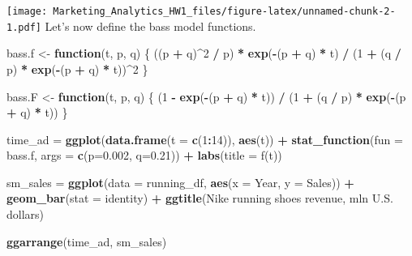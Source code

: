 \documentclass[
]{article}
\newenvironment{Shaded}{\begin{snugshade}}{\end{snugshade}}
\newcommand{\AttributeTok}[1]{\textcolor[rgb]{0.13,0.29,0.53}{#1}}
\newcommand{\ControlFlowTok}[1]{\textcolor[rgb]{0.13,0.29,0.53}{\textbf{#1}}}
\newcommand{\DecValTok}[1]{\textcolor[rgb]{0.00,0.00,0.81}{#1}}
\newcommand{\FloatTok}[1]{\textcolor[rgb]{0.00,0.00,0.81}{#1}}
\newcommand{\FunctionTok}[1]{\textcolor[rgb]{0.13,0.29,0.53}{\textbf{#1}}}
\newcommand{\NormalTok}[1]{#1}
\newcommand{\OtherTok}[1]{\textcolor[rgb]{0.56,0.35,0.01}{#1}}
\newcommand{\SpecialCharTok}[1]{\textcolor[rgb]{0.81,0.36,0.00}{\textbf{#1}}}
\newcommand{\StringTok}[1]{\textcolor[rgb]{0.31,0.60,0.02}{#1}}
\begin{document}
\texttt{[image: Marketing\_Analytics\_HW1\_files/figure-latex/unnamed-chunk-2-1.pdf]}
Let's now define the bass model functions.

\begin{Shaded}
\begin{Highlighting}[]
\NormalTok{bass.f }\OtherTok{\textless{}{-}} \ControlFlowTok{function}\NormalTok{(t, p, q) \{}
\NormalTok{  ((p }\SpecialCharTok{+}\NormalTok{ q)}\SpecialCharTok{\^{}}\DecValTok{2} \SpecialCharTok{/}\NormalTok{ p) }\SpecialCharTok{*} \FunctionTok{exp}\NormalTok{(}\SpecialCharTok{{-}}\NormalTok{(p }\SpecialCharTok{+}\NormalTok{ q) }\SpecialCharTok{*}\NormalTok{ t) }\SpecialCharTok{/}\NormalTok{ (}\DecValTok{1} \SpecialCharTok{+}\NormalTok{ (q }\SpecialCharTok{/}\NormalTok{ p) }\SpecialCharTok{*} \FunctionTok{exp}\NormalTok{(}\SpecialCharTok{{-}}\NormalTok{(p }\SpecialCharTok{+}\NormalTok{ q) }\SpecialCharTok{*}\NormalTok{ t))}\SpecialCharTok{\^{}}\DecValTok{2}
\NormalTok{\}}

\NormalTok{bass.F }\OtherTok{\textless{}{-}} \ControlFlowTok{function}\NormalTok{(t, p, q) \{}
\NormalTok{  (}\DecValTok{1} \SpecialCharTok{{-}} \FunctionTok{exp}\NormalTok{(}\SpecialCharTok{{-}}\NormalTok{(p }\SpecialCharTok{+}\NormalTok{ q) }\SpecialCharTok{*}\NormalTok{ t)) }\SpecialCharTok{/}\NormalTok{ (}\DecValTok{1} \SpecialCharTok{+}\NormalTok{ (q }\SpecialCharTok{/}\NormalTok{ p) }\SpecialCharTok{*} \FunctionTok{exp}\NormalTok{(}\SpecialCharTok{{-}}\NormalTok{(p }\SpecialCharTok{+}\NormalTok{ q) }\SpecialCharTok{*}\NormalTok{ t))}
\NormalTok{\}}

\NormalTok{time\_ad }\OtherTok{=} \FunctionTok{ggplot}\NormalTok{(}\FunctionTok{data.frame}\NormalTok{(}\AttributeTok{t =} \FunctionTok{c}\NormalTok{(}\DecValTok{1}\SpecialCharTok{:}\DecValTok{14}\NormalTok{)), }\FunctionTok{aes}\NormalTok{(t)) }\SpecialCharTok{+}
\FunctionTok{stat\_function}\NormalTok{(}\AttributeTok{fun =}\NormalTok{ bass.f, }\AttributeTok{args =} \FunctionTok{c}\NormalTok{(}\AttributeTok{p=}\FloatTok{0.002}\NormalTok{, }\AttributeTok{q=}\FloatTok{0.21}\NormalTok{)) }\SpecialCharTok{+}
\FunctionTok{labs}\NormalTok{(}\AttributeTok{title =} \StringTok{\textquotesingle{}f(t)\textquotesingle{}}\NormalTok{)}

\NormalTok{sm\_sales }\OtherTok{=} \FunctionTok{ggplot}\NormalTok{(}\AttributeTok{data =}\NormalTok{ running\_df, }\FunctionTok{aes}\NormalTok{(}\AttributeTok{x =}\NormalTok{ Year, }\AttributeTok{y =}\NormalTok{ Sales)) }\SpecialCharTok{+}
\FunctionTok{geom\_bar}\NormalTok{(}\AttributeTok{stat =} \StringTok{\textquotesingle{}identity\textquotesingle{}}\NormalTok{) }\SpecialCharTok{+}
\FunctionTok{ggtitle}\NormalTok{(}\StringTok{\textquotesingle{}Nike running shoes revenue, mln U.S. dollars\textquotesingle{}}\NormalTok{)}

\FunctionTok{ggarrange}\NormalTok{(time\_ad, sm\_sales)}
\end{Highlighting}
\end{Shaded}
\end{document}
